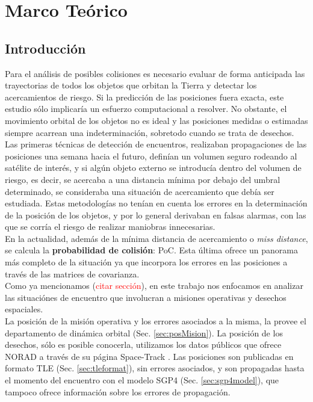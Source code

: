 \chapter{Marco Teórico}
\label{chap:marcoteorico}
\section{Introducci\'on}

Para el an\'alisis de posibles colisiones es necesario evaluar de forma anticipada las trayectorias de todos los objetos que orbitan la Tierra y detectar los acercamientos de riesgo. Si la predicci\'on de las posiciones fuera exacta, este estudio s\'olo implicar\'ia un esfuerzo computacional a resolver. No obstante, el movimiento orbital de los objetos no es ideal y las posiciones medidas o estimadas siempre acarrean una indeterminaci\'on, sobretodo cuando se trata de desechos.\\

Las primeras t\'ecnicas de detecci\'on de encuentros, realizaban propagaciones de las posiciones una semana hacia el futuro, defin\'ian un volumen seguro rodeando al sat\'elite de inter\'es, y si alg\'un objeto externo se introduc\'ia dentro del volumen de riesgo, es decir, se acercaba a una distancia m\'inima por debajo del umbral determinado, se consideraba una situaci\'on de acercamiento que deb\'ia ser estudiada. Estas metodolog\'ias no ten\'ian en cuenta los errores en la determinaci\'on de la posici\'on de los objetos, y por lo general derivaban en falsas alarmas, con las que se corr\'ia el riesgo de realizar maniobras innecesarias.\\
En la actualidad, adem\'as de la m\'inima distancia de acercamiento o {\it{miss distance}}, se calcula la {\bf{probabilidad de colisi\'on}}: PoC.  Esta \'ultima ofrece un panorama m\'as completo de la situaci\'on ya que incorpora los errores en las posiciones a trav\'es de las matrices de covarianza.\\

Como ya mencionamos (\textcolor{red}{citar secci\'on}), en este trabajo nos enfocamos en analizar las situaci\'ones de encuentro que involucran a misiones operativas y desechos espaciales.\\

La posici\'on de la misi\'on operativa y los errores asociados a la misma, la provee el departamento de din\'amica orbital (Sec. \ref{sec:posMision}).
La posici\'on de los desechos, s\'olo es posible conocerla, utilizamos los datos p\'ublicos que ofrece \ac{NORAD} a trav\'es de su p\'agina Space-Track \cite{spacetrack}. Las posiciones son publicadas en formato \ac{TLE} (Sec. \ref{sec:tleformat}), sin errores asociados, y son propagadas hasta el momento del encuentro con el modelo SGP4 (Sec. \ref{sec:sgp4model}), que tampoco ofrece informaci\'on sobre los errores de propagaci\'on.\\


